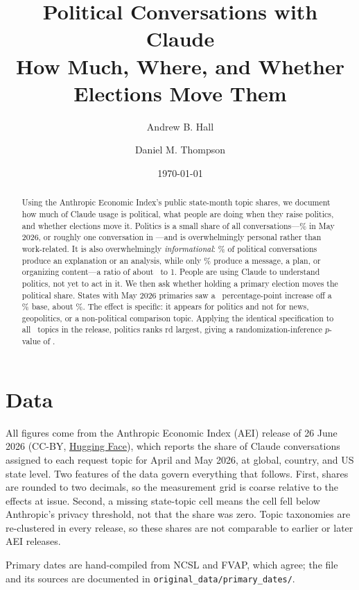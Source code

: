 \documentclass[11pt]{article}
\title{\textbf{Political Conversations with Claude}\\[2mm]
\large How Much, Where, and Whether Elections Move Them}
\author{Andrew B. Hall \and Daniel M. Thompson}
\date{\today}
\begin{document}
\maketitle
\onehalfspacing

\begin{abstract}
\noindent Using the Anthropic Economic Index's public state-month topic shares, we document
how much of Claude usage is political, what people are doing when they raise
politics, and whether elections move it. Politics is a small share of all
conversations---\polNatlMay\% in May 2026, or roughly one conversation in
\polOneInN---and is overwhelmingly personal rather than work-related. It is also
overwhelmingly \emph{informational}: \artInfoShare\% of political conversations
produce an explanation or an analysis, while only \artDoingShare\% produce a
message, a plan, or organizing content---a ratio of about
\artInfoDoingRatio\ to 1. People are using Claude to understand politics, not yet
to act in it. We then ask whether holding a primary election moves the political
share. States with May 2026 primaries saw a \mainEst\ percentage-point increase
off a \mainBase\% base, about \mainPct\%. The effect is specific: it appears for
politics and not for news, geopolitics, or a non-political comparison topic.
Applying the identical specification to all \nullN\ topics in the release,
politics ranks \polRank rd largest, giving a randomization-inference $p$-value of
\riP.
\end{abstract}

\section{Data}

All figures come from the Anthropic Economic Index (AEI) release of 26 June 2026
(CC-BY, \href{https://huggingface.co/datasets/Anthropic/EconomicIndex}{Hugging Face}),
which reports the share of Claude conversations assigned to each request topic for
April and May 2026, at global, country, and US state level. Two features of the data
govern everything that follows. First, shares are rounded to two decimals, so the
measurement grid is coarse relative to the effects at issue. Second, a missing
state-topic cell means the cell fell below Anthropic's privacy threshold, not that
the share was zero. Topic taxonomies are re-clustered in every release, so these
shares are not comparable to earlier or later AEI releases.

Primary dates are hand-compiled from NCSL and FVAP, which agree; the file and its
sources are documented in \texttt{original\_data/primary\_dates/}.
\end{document}
